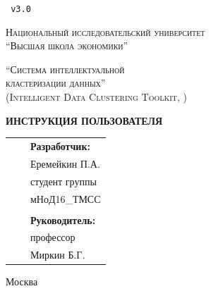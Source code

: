 \documentclass[12pt,tikz]{instruction}
\begin{document}
 
\begin{titlepage}
	\centering	
	\texttt { v3.0}

	{\scshape\small Национальный исследовательский университет \\
		``Высшая школа экономики'' \par}
	\vspace{2cm}
	{\scshape\Large ``Система интеллектуальной \\кластеризации данных'' \\
		(Intelligent Data Clustering Toolkit, \SysName)\par}
	\vspace{1.5cm}
	{\Huge\bfseries ИНСТРУКЦИЯ ПОЛЬЗОВАТЕЛЯ\par}
	\vspace{2cm}
	\vfill
	\begin{center}
		\begin{tabular}{  p{7cm}  p{4cm} p{5cm}  } 
			& & \textbf{Разработчик:}\\ 
			& & Еремейкин П.А. \\ 
			& & студент группы \\
			& & мНоД16\_ТМСС\\
			& & \\
			& & \textbf{Руководитель: }\\
			& & профессор\\
			& & Миркин Б.Г.\\
		\end{tabular}
	\end{center}
	\vfill
	{Москва \the\year\par}
\end{titlepage}

%
%	
\end{document}

